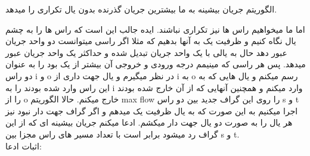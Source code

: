 \problem{}
الگوریتم جریان بیشینه به ما بیشترین جریان گذرنده بدون یال تکراری را میدهد.

اما ما میخواهیم راس ها نیز تکراری نباشند.
ایده جالب این است که راس ها را به چشم یال نگاه کنیم و ظرفیت یک به آنها بدهیم که مثلا
اگر راسی میتوانست دو واحد جریان عبور دهد حال به یالی با یک واحد جریان تبدیل شده
و حداکثر یک واحد جریان عبور میدهد.
پس هر راسی که مینیمم درجه ورودی و خروجی آن بیشتر از یک بود را به عنوان دو راس 
i و o در نظر میگیرم و یال جهت داری
از i به o رسم میکنم و یال هایی که به این راس وارد شده بودند را به 
i وارد میکنم 
و همچنین آنهایی که از آن خارج شده بودند را از o خارج میکنم.
حالا الگوریتم max flow را روی این گراف جدید بین دو راس s و t اجرا میکنیم
به این صورت که به یال ظرفیت یک میدهم و اگر گراف جهت دار نبود نیز هر یال را به صورت 
دو یال جهت دار میکشم.
ادعا میکنم جریان بیشینه ای که از این گراف رد میشود برابر است با تعداد مسیر های
راس مجزا بین s و t.\\
اثبات ادعا:\\
